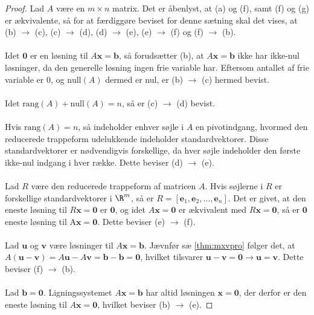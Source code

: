 \begin{proof}
Lad $A$ være en $m \times n$ matrix.
Det er åbenlyst, at (a) og (f), samt (f) og (g) er ækvivalente, så for at færdiggøre beviset for denne sætning skal det vises, at (b) $\rightarrow$ (c), (c) $\rightarrow$ (d), (d) $\rightarrow$ (e), (e) $\rightarrow$ (f) og (f) $\rightarrow$ (b).
\\\\
Idet $\mathbf{0}$ er en løsning til $A\mathbf{x}=\mathbf{b}$, så forudsætter (b), at $A\mathbf{x}=\mathbf{b}$ ikke har ikke-nul løsninger, da den generelle løsning ingen frie variable har. 
Eftersom antallet af frie variable er $0$, og $\text{null}(A)$ dermed er nul, er (b) $\rightarrow$ (c) hermed bevist. 
\\\\
Idet $\text{rang}(A)+\text{null}(A)=n$, så er (c) $\rightarrow$ (d) bevist.
\\\\
%
Hvis $\text{rang}(A)=n$, så indeholder enhver søjle i $A$ en pivotindgang, hvormed den reducerede trappeform udelukkende indeholder standardvektorer. 
Disse standardvektorer er nødvendigvis forskellige, da hver søjle indeholder den første ikke-nul indgang i hver række. 
Dette beviser (d) $\rightarrow$ (e).
%
\\\\
Lad $R$ være den reducerede trappeform af matricen $A$. Hvis søjlerne i $R$ er forskellige standardvektorer i $\R^m$, så er $R= [ \mathbf{e}_1, \mathbf{e}_2, \ldots, \mathbf{e}_n]$. 
Det er givet, at den eneste løsning til $R\mathbf{x}=\mathbf{0}$ er $\mathbf{0}$, og idet $A\mathbf{x}=\mathbf{0}$ er ækvivalent med $R\mathbf{x}=\mathbf{0}$, så er $\mathbf{0}$ eneste løsning til A$\mathbf{x}=\mathbf{0}$. 
Dette beviser (e) $\rightarrow$ (f).
\\\\
%
Lad $\mathbf{u}$ og $\mathbf{v}$ være løsninger til $A\mathbf{x}=\mathbf{b}$.
Jævnfør sæ \ref{thm:mxvpro} følger det, at $A(\mathbf{u}-\mathbf{v})=A\mathbf{u}-A\mathbf{v}=\mathbf{b}-\mathbf{b}=\mathbf{0}$, hvilket tilsvarer $\mathbf{u}-\mathbf{v}=\mathbf{0}
\rightarrow  
\mathbf{u} =\mathbf{v}$. Dette beviser (f) $\rightarrow$ (b).
\\\\
%
Lad $\mathbf{b}=\mathbf{0}$. 
Ligningssystemet $A\mathbf{x}=\mathbf{b}$ har altid løsningen $\mathbf{x}=\mathbf{0}$, der derfor er den eneste løsning til $A\mathbf{x}=\mathbf{0}$, hvilket beviser (b) $\rightarrow$ (e).
%
\end{proof}
